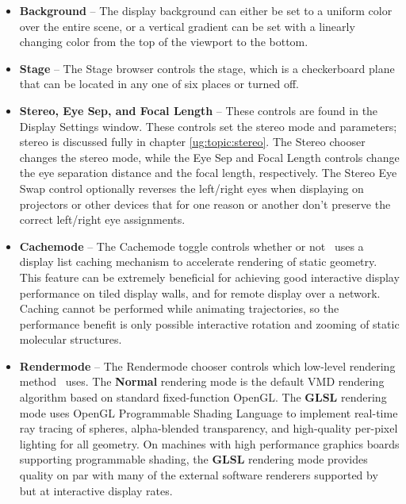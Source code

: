 \begin{itemize}
  \item {\bf Background} --
The display background can either be set to a uniform color over
the entire scene, or a vertical gradient can be set with a linearly
changing color from the top of the viewport to the bottom.

  \item {\bf Stage} --
The {\sf Stage} browser controls the stage, which is a checkerboard plane
that can be located in any one of six places or turned off.

  \item {\bf Stereo, Eye Sep, and Focal Length} --
\label{ug:ui:window:stereo}
These controls are found in the {\sf Display Settings} window.
These controls set the stereo mode and parameters; stereo is discussed
fully in
chapter \ref{ug:topic:stereo}.
The {\sf Stereo} chooser changes the stereo mode, while the {\sf Eye Sep}
and {\sf Focal Length} controls change the eye separation distance and the
focal length, respectively.
The {\sf Stereo Eye Swap} control optionally reverses the left/right eyes
when displaying on projectors or other devices that for one reason or
another don't preserve the correct left/right eye assignments.

  \item {\bf Cachemode} --
The {\sf Cachemode} toggle controls whether or not \VMD\ uses
a display list caching mechanism to accelerate rendering of 
static geometry.  This feature can be extremely beneficial for
achieving good interactive display performance on tiled display walls,
and for remote display over a network.  Caching cannot be performed
while animating trajectories, so the performance benefit is only possible
interactive rotation and zooming of static molecular structures.

  \item {\bf Rendermode} --
The {\sf Rendermode} chooser controls which low-level rendering method
\VMD\ uses.  The {\bf Normal} rendering mode is the default VMD rendering
algorithm based on standard fixed-function OpenGL.  The {\bf GLSL} 
rendering mode uses OpenGL Programmable Shading Language to implement
real-time ray tracing of spheres, alpha-blended transparency,
and high-quality per-pixel lighting for all geometry.  On machines
with high performance graphics boards supporting programmable shading,
the {\bf GLSL} rendering mode provides quality on par with many of
the external software renderers supported by \VMD\, but at interactive 
display rates.


\end{itemize}
